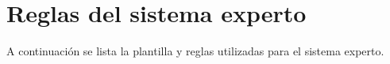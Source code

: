 \chapter{Reglas del sistema experto}
\label{cap:Reglas del sistema experto}

\newcommand{\includecode}[2][c]{<!---->}

A continuación se lista la plantilla y reglas utilizadas para el sistema experto.




